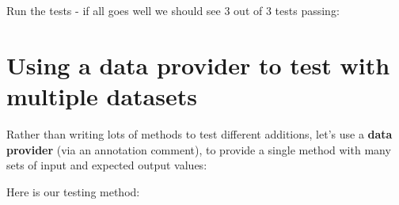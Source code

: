 \documentclass[a4paperpaper,openright]{book}
\newenvironment{Shaded}{}{}
\newcommand{\AnnotationTok}[1]{\textcolor[rgb]{0.38,0.63,0.69}{\textbf{\textit{#1}}}}
\newcommand{\CommentTok}[1]{\textcolor[rgb]{0.38,0.63,0.69}{\textit{#1}}}
\newcommand{\ExtensionTok}[1]{#1}
\newcommand{\KeywordTok}[1]{\textcolor[rgb]{0.00,0.44,0.13}{\textbf{#1}}}
\newcommand{\NormalTok}[1]{#1}
\newcommand{\OtherTok}[1]{\textcolor[rgb]{0.00,0.44,0.13}{#1}}
\begin{document}
Run the tests - if all goes well we should see 3 out of 3 tests passing:

\begin{Shaded}
\end{Shaded}

\hypertarget{using-a-data-provider-to-test-with-multiple-datasets}{%
\section{Using a data provider to test with multiple
datasets}\label{using-a-data-provider-to-test-with-multiple-datasets}}

Rather than writing lots of methods to test different additions, let's
use a \textbf{data provider} (via an annotation comment), to provide a
single method with many sets of input and expected output values:

Here is our testing method:

\begin{Shaded}
\end{Shaded}
\end{document}
